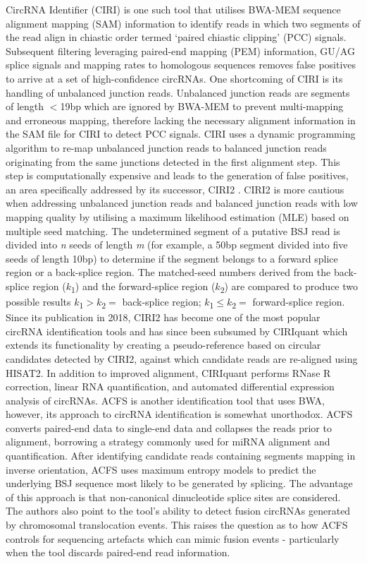 \documentclass[journal,review,submit,pdftex,moreauthors]{Definitions/mdpi}
\begin{document}
CircRNA Identifier (CIRI) \cite{CIRI} is one such tool that utilises BWA-MEM sequence alignment mapping (SAM) information to identify reads in which two segments of the read align in chiastic order termed `paired chiastic clipping' (PCC) signals. Subsequent filtering leveraging paired-end mapping (PEM) information, GU/AG splice signals and mapping rates to homologous sequences removes false positives to arrive at a set of high-confidence circRNAs. One shortcoming of CIRI is its handling of unbalanced junction reads. Unbalanced junction reads are segments of length $<$19bp which are ignored by BWA-MEM to prevent multi-mapping and erroneous mapping, therefore lacking the necessary alignment information in the SAM file for CIRI to detect PCC signals. CIRI uses a dynamic programming algorithm to re-map unbalanced junction reads to balanced junction reads originating from the same junctions detected in the first alignment step. This step is computationally expensive and leads to the generation of false positives, an area specifically addressed by its successor, CIRI2 \cite{CIRI2}. CIRI2 is more cautious when addressing unbalanced junction reads and balanced junction reads with low mapping quality by utilising a maximum likelihood estimation (MLE) based on multiple seed matching. The undetermined segment of a putative BSJ read is divided into \textit{n} seeds of length \textit{m} (for example, a 50bp segment divided into five seeds of length 10bp) to determine if the segment belongs to a forward splice region or a back-splice region. The matched-seed numbers derived from the back-splice region ($k$\textsubscript{1}) and the forward-splice region ($k$\textsubscript{2}) are compared to produce two possible results $k$\textsubscript{1}$>$$k$\textsubscript{2}$=$ back-splice region; $k$\textsubscript{1}$\leq$$k$\textsubscript{2}$=$ forward-splice region. Since its publication in 2018, CIRI2 has become one of the most popular circRNA identification tools and has since been subsumed by CIRIquant \cite{CIRIquant} which extends its functionality by creating a pseudo-reference based on circular candidates detected by CIRI2, against which candidate reads are re-aligned using HISAT2. In addition to improved alignment, CIRIquant performs RNase R correction, linear RNA quantification, and automated differential expression analysis of circRNAs. ACFS \cite{ACFS} is another identification tool that uses BWA, however, its approach to circRNA identification is somewhat unorthodox. ACFS converts paired-end data to single-end data and collapses the reads prior to alignment, borrowing a strategy commonly used for miRNA alignment and quantification. After identifying candidate reads containing segments mapping in inverse orientation, ACFS uses maximum entropy models to predict the underlying BSJ sequence most likely to be generated by splicing. The advantage of this approach is that non-canonical dinucleotide splice sites are considered. The authors also point to the tool's ability to detect fusion circRNAs generated by chromosomal translocation events. This raises the question as to how ACFS controls for sequencing artefacts which can mimic fusion events - particularly when the tool discards paired-end read information. \par
\end{document}
